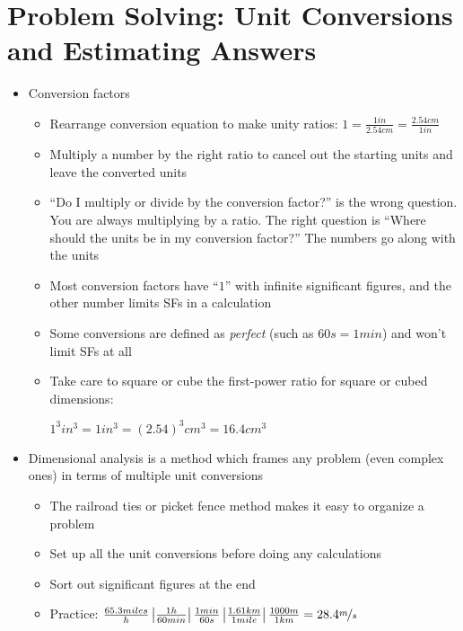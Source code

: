 \documentclass[12pt, openany, letterpaper]{memoir}
\begin{document}
\section{Problem Solving: Unit Conversions and Estimating Answers}
\begin{itemize}
	\item Conversion factors
	\begin{itemize}
		\item Rearrange conversion equation to make unity ratios: $1=\frac{1in}{2.54cm}=\frac{2.54cm}{1in}$
		\item Multiply a number by the right ratio to cancel out the starting units and leave the converted units
		\item ``Do I multiply or divide by the conversion factor?'' is the wrong question. You are always multiplying by a ratio. The right question is ``Where should the units be in my conversion factor?'' The numbers go along with the units
		\item Most conversion factors have ``$1$'' with infinite significant figures, and the other number limits SFs in a calculation
		\item Some conversions are defined as \emph{perfect} (such as $60s=1min$) and won't limit SFs at all
		\item Take care to square or cube the first-power ratio for square or cubed dimensions: 
		
		$1^3in^3=1in^3=\left(2.54\right)^3cm^3=16.4cm^3$
	\end{itemize}
	\item Dimensional analysis is a method which frames any problem (even complex ones) in terms of multiple unit conversions
	\begin{itemize}
		\item The railroad ties or picket fence method makes it easy to organize a problem
		\item Set up all the unit conversions before doing any calculations
		\item Sort out significant figures at the end
		\item Practice: $\frac{65.3miles}{h}\left|\frac{1h}{60min}\right|\frac{1min}{60s}\left|\frac{1.61km}{1mile}\right|\frac{1000m}{1km}=28.4\nicefrac{m}{s}$
	\end{itemize}
	
\end{itemize}
\end{document}
